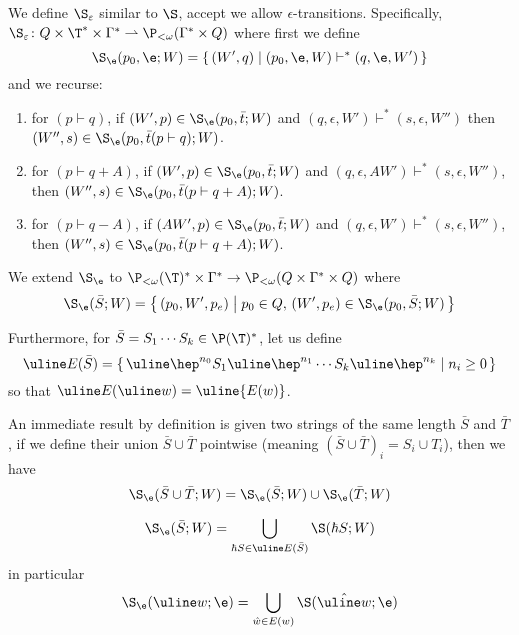 \documentclass{llncs}
\begin{document}

We define $\S_\epsilon$ similar to $\S$, accept we allow $\epsilon$-transitions.
Specifically, $\S_\epsilon\colon Q\times\T^*\times\Gamma^*\partial\P_{<\omega}(\Gamma^*\times Q)$ where first we define
$$ \S_\e(p_0,\e;W)=\set{(W',q)}[(p_0,\e,W)\vdash^*(q,\e,W')] $$
and we recurse:
\begin{enumerate}
    \item for $(p\vdash q)$, if $(W',p)\in\S_\e(p_0,\bar t;W)$ and $(q,\epsilon,W')\vdash^*(s,\epsilon,W'')$ then $(W'',s)\in\S_\e(p_0,\bar t(p\vdash q);W)$.
    \item for $(p\vdash q+A)$, if $(W',p)\in\S_\e(p_0,\bar t;W)$ and $(q,\epsilon,AW')\vdash^*(s,\epsilon,W'')$, then $(W'',s)\in\S_\e(p_0,\bar t(p\vdash q+A);W)$.
    \item for $(p\vdash q-A)$, if $(AW',p)\in\S_\e(p_0,\bar t;W)$ and $(q,\epsilon,W')\vdash^*(s,\epsilon,W'')$, then $(W'',s)\in\S_\e(p_0,\bar t(p\vdash q+A);W)$.
\end{enumerate}
We extend $\S_\e$ to $\P_{<\omega}(\T)^*\times\Gamma^*\to\P_{<\omega}(Q\times\Gamma^*\times Q)$ where
$$ \S_\e(\bar S;W) = \set{(p_0,W',p_e)}[p_0\in Q,\,(W',p_e)\in\S_\e(p_0,\bar S;W)] $$

Furthermore, for $\bar S=S_1\cdots S_k\in\P(\T)^*$, let us define
$$ \uline E(\bar S) = \set{\uline\hep^{n_0}S_1\uline\hep^{n_1}\cdots S_k\uline\hep^{n_k}}[n_i\geq0] $$
so that $\uline E(\uline w)=\uline{E(w)}$.

An immediate result by definition is given two strings of the same length $\bar S$ and $\bar T$, if we define their union $\bar S\cup\bar T$ pointwise (meaning $(\bar S\cup\bar T)_i=S_i\cup T_i$), then we have
$$ \S_\e(\bar S\cup\bar T;W) = \S_\e(\bar S;W)\cup\S_\e(\bar T;W) $$

\begin{lemma}

    $$ \S_\e(\bar S;W) = \bigcup_{\hbar S\in\uline E(\bar S)}\S(\hbar S;W) $$
    in particular
    $$ \S_\e(\uline w;\e) = \bigcup_{\hat w\in E(w)}\S(\hat{\uline w};\e) $$

\end{lemma}
\end{document}
